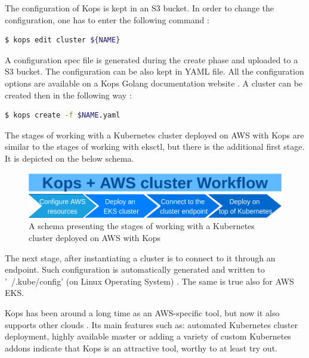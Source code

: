 The configuration of Kops is kept in an S3 bucket. In order to change the configuration, one has to enter the following command \cite{online-kops-aws}:
\begin{lstlisting}[basicstyle=\small,caption={A command of Kops CLI tool used to edit a Kubernetes cluster configuration},captionpos=b,language=Bash,xleftmargin=1cm]
$ kops edit cluster ${NAME}
\end{lstlisting}

A configuration spec file is generated during the create phase and uploaded to a S3 bucket. The configuration can be also kept in YAML file. All the configuration options are available on a Kops Golang documentation website \cite{online-kops-yaml-config-golang}. A cluster can be created then in the following way \cite{online-kops-yaml-config}:
\begin{lstlisting}[basicstyle=\small,caption={A command of Kops CLI tool used to create a Kubernetes cluster using a YAML configuration file},captionpos=b,language=Bash,xleftmargin=1cm]
$ kops create -f $NAME.yaml
\end{lstlisting}


The stages of working with a Kubernetes cluster deployed on AWS with Kops are similar to the stages of working with eksctl, but there is the additional first stage. It is depicted on the below schema.
\begin{figure}[H]
    \centering
    \includegraphics[width=12cm]{figures/kops-aws-workflow.png}
    \captionsetup{justification=centering,margin=2cm}
    \caption{A schema presenting the stages of working with a Kubernetes cluster deployed on AWS with Kops}
\end{figure}

The next stage, after instantiating a cluster is to connect to it through an endpoint. Such configuration is automatically generated and written to '~/.kube/config' (on Linux Operating System) \cite{online-kops-aws}. The same is true also for AWS EKS.

Kops has been around a long time as an AWS-specific tool, but now it also supports other clouds \cite{book-cndwk} \cite{online-kops-gh}. Its main features such as: automated Kubernetes cluster deployment, highly available master or adding a variety of custom Kubernetes addons \cite{kops-addons} indicate that Kops is an attractive tool, worthy to at least try out.

